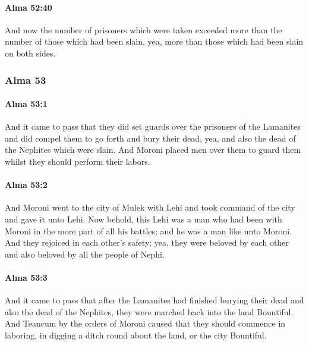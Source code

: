 		\paragraph{Alma 52:40} %
			\label{ALMA-52-40}

			And now the number of prisoners which were taken
			exceeded more than the number of those which had been slain,
			yea, more than those which had been slain on both sides.

	\subsubsection{Alma 53} %
		\label{ALMA-53}
		
		\paragraph{Alma 53:1} %
			\label{ALMA-53-1}

			And it came to pass that they did set guards over the prisoners of the Lamanites
			and did compel them to go forth and bury their dead,
			yea, and also the dead of the Nephites which were slain.
			And Moroni placed men over them to guard them
			whilst they should perform their labors.

		\paragraph{Alma 53:2} %
			\label{ALMA-53-2}

			And Moroni went to the city of Mulek with Lehi
			and took command of the city and gave it unto Lehi.
			Now behold, this Lehi was a man who had been with Moroni
			in the more part of all his battles;
			and he was a man like unto Moroni.
			And they rejoiced in each other's safety;
			yea, they were beloved by each other
			and also beloved by all the people of Nephi.

		\paragraph{Alma 53:3} %
			\label{ALMA-53-3}

			And it came to pass that
			after the Lamanites had finished burying their dead
			and also the dead of the Nephites,
			they were marched back into the land Bountiful.
			And Teancum by the orders of Moroni caused
			that they should commence in laboring,
			in digging a ditch round about the land, or the city Bountiful.

